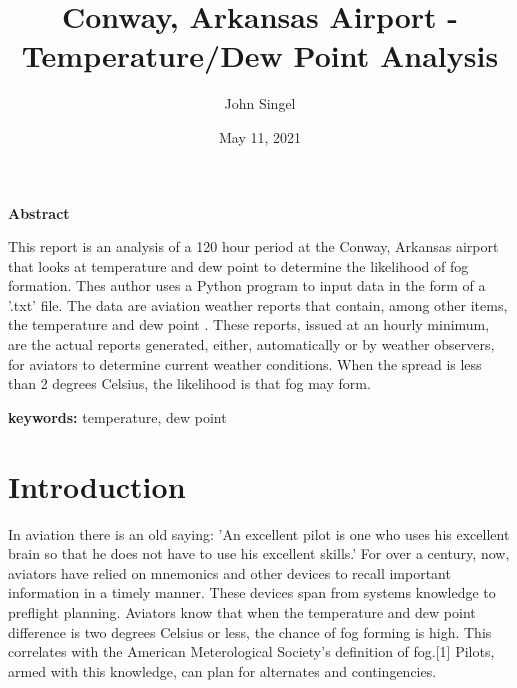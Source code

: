 \documentclass{article}
\begin{document}
\pagebreak
\hspace{0pt}
\vfill
\begin{center}
\LARGE
\textbf{Abstract}
\end{center}

\normalsize
This report is an analysis of a 120 hour period at the Conway, Arkansas airport that looks at temperature and dew point to determine the likelihood of fog formation. Thes author uses a Python program to input data in the form of a '.txt' file. The data are aviation weather reports that contain, among other items, the temperature and dew point . These reports, issued at an hourly minimum, are the actual reports generated, either, automatically or by weather observers, for aviators to determine current weather conditions. When the spread is less than 2 degrees Celsius, the likelihood is that fog may form.

\bigskip
\begin{flushleft}
\textbf{keywords:} temperature, dew point
\end{flushleft}

\vfill
\hspace{0pt}
\pagebreak

\newpage


\title{Conway, Arkansas Airport - Temperature/Dew Point Analysis}
\author{John Singel}\date{May 11, 2021}

\maketitle

\section{Introduction}
In aviation there is an old saying: 'An excellent pilot is one who uses his excellent brain so that he does not have to use his excellent skills.' For over a century, now, aviators have relied on mnemonics and other devices to recall important information in a timely manner. These devices span from systems knowledge to preflight planning. Aviators know that when the temperature and dew point difference is two degrees Celsius or less, the chance of fog forming is high. This correlates with the American Meterological Society's definition of fog.[1] Pilots, armed with this knowledge, can plan for alternates and contingencies.
\end{document}
